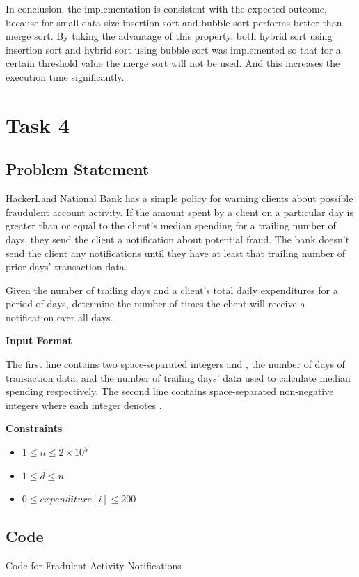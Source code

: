 In conclusion, the implementation is consistent with the expected outcome,
because for small data size insertion sort and bubble sort performs better than
merge sort. By taking the advantage of this property, both hybrid sort using
insertion sort and hybrid sort using bubble sort was implemented so that for 
a certain threshold value the merge sort will not be used. And this increases 
the execution time significantly.

\newpage
\section{Task 4}
\subsection{Problem Statement}
HackerLand National Bank has a simple policy for warning clients about possible fraudulent account activity. If the amount spent by a client on a particular day is greater than or equal to  the client's median spending for a trailing number of days, they send the client a notification about potential fraud. The bank doesn't send the client any notifications until they have at least that trailing number of prior days' transaction data.

Given the number of trailing days  and a client's total daily expenditures for a period of  days, determine the number of times the client will receive a notification over all  days.

\textbf{Input Format}

The first line contains two space-separated integers  and , the number of days of transaction data, and the number of trailing days' data used to calculate median spending respectively.
The second line contains  space-separated non-negative integers where each integer  denotes .

\textbf{Constraints}
\begin{itemize}
    \item $ 1 \le n \le 2\times10^5  $
    \item $ 1\le d \le n $
    \item $ 0 \le expenditure[i] \le 200 $ 
\end{itemize}

\subsection{Code}
\begin{code}
    \label{code:fradulent}
    \caption{Code for Fradulent Activity Notifications}
\end{code}

